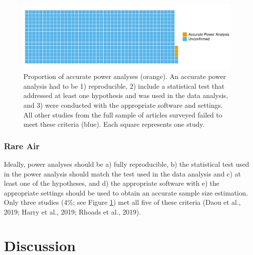 \documentclass[
  man, donotrepeattitle,mask,floatsintext]{apa7}
\begin{document}
\begin{figure}

{\centering \includegraphics{../../figs/fig4} 

}

\caption{\normalfont
Proportion of accurate power analyses (orange). An accurate power analysis had to be 1) reproducible, 2) include a statistical test that addressed at least one hypothesis and was used in the data analysis, and 3) were conducted with the appropriate software and settings. All other studies from the full sample of articles surveyed failed to meet these criteria (blue). Each square represents one study.}\label{fig:fig4}
\end{figure}




\hypertarget{rare-air}{%
\subsubsection{Rare Air}\label{rare-air}}

Ideally, power analyses should be a) fully reproducible, b) the statistical test used in the power analysis should match the test used in the data analysis and c) at least one of the hypotheses, and d) the appropriate software with e) the appropriate settings should be used to obtain an accurate sample size estimation. Only three studies (4\%; see Figure \ref{fig:fig4}) met all five of these criteria (Daou et al., 2019; Harry et al., 2019; Rhoads et al., 2019).

\clearpage

\hypertarget{discussion}{%
\section{Discussion}\label{discussion}}
\end{document}
